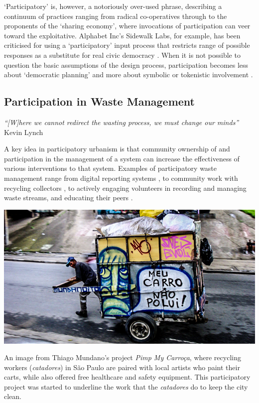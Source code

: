 \documentclass[nofonts,nols,justified,nobib]{tufte-book}
\begin{document}
`Participatory' is, however, a notoriously over-used phrase, describing a continuum of practices ranging from radical co-operatives through to the proponents of the `sharing economy', where invocations of participation can veer toward the exploitative. Alphabet Inc's Sidewalk Labs, for example, has been criticised for using a `participatory' input process that restricts range of possible responses as a substitute for real civic democracy \cite{mattern_sidewalk_2019}. When it is not possible to question the basic assumptions of the design process, participation becomes less about `democratic planning' and more about symbolic or tokenistic involvement \cite{arnstein_ladder_1969}. %

\subsection*{Participation in Waste Management}
\begin{flushright}
\emph{``[W]here we cannot redirect the wasting process, we must change our minds''}\cite{lynch_wasting_1990} \\
Kevin Lynch
\end{flushright}

A key idea in participatory urbanism is that community ownership of and participation in the management of a system can increase the effectiveness of various interventions to that system. Examples of participatory waste management range from digital reporting systems \cite{offenhuber_waste_2017}, to community work with recycling collectors \cite{tremblay_united_2010, mundano_pimp_nodate}, to actively engaging volunteers in recording and managing waste streams, and educating their peers \cite{offenhuber_waste_2017}. 

\begin{marginfigure}
\includegraphics[width=\textwidth]{img/1/catadores.jpg}
\caption{An image from Thiago Mundano's project \emph{Pimp My Carro\c{c}a}, where recycling workers (\emph{catadores}) in S\~{a}o Paulo are paired with local artists who paint their carts, while also offered free healthcare and safety equipment. This participatory project was started to underline the work that the \emph{catadores} do to keep the city clean. \cite{mundano_pimp_nodate}}
\end{marginfigure}
\end{document}
